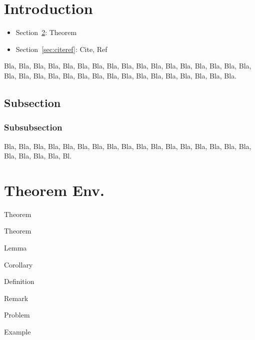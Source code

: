 \documentclass{PiMart}    %
\begin{document}
\maketitle
\section{Introduction}\label{sec:Intro}
\begin{itemize}
\item Section~\ref{sec:theorem}: Theorem
\item Section~\ref{sec:citeref}: Cite, Ref
\end{itemize}
Bla, Bla, Bla, Bla, Bla, Bla, Bla, Bla, Bla, Bla, Bla, Bla, Bla, Bla, Bla, Bla, Bla, Bla, Bla, Bla, Bla, Bla, Bla, Bla, Bla, Bla, Bla, Bla, Bla, Bla, Bla, Bla, Bla.
\subsection{Subsection}
\subsubsection{Subsubsection}
Bla, Bla, Bla, Bla, Bla, Bla, Bla, Bla, Bla, Bla, Bla, Bla, Bla, Bla, Bla, Bla, Bla, Bla, Bla, Bla, Bla, Bl.
\section{Theorem Env.} \label{sec:theorem}
\begin{theorem}\label{thm:a}
Theorem
\end{theorem}
\begin{theorem}[\cite{[1]}]
Theorem
\end{theorem}
\begin{lemma}[{\cite[Theorem~2]{[5]}}]
Lemma
\end{lemma}
\begin{corollary}\label{cor:a}
Corollary
\end{corollary}
\begin{definition}[XXX]\label{def:a}
Definition
\end{definition}

\begin{remark}[\cite{[1]}]
Remark
\end{remark}
\begin{problem}
Problem
\end{problem}
\begin{example}
Example
\end{example}
\end{document}
